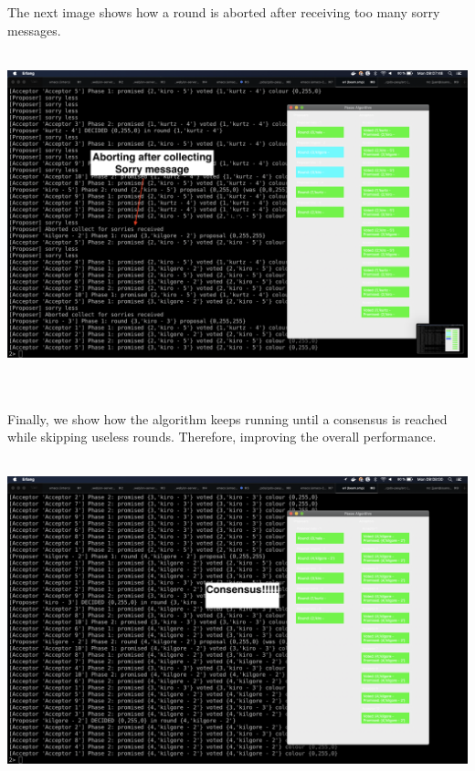 \documentclass[a4paper, 10pt]{article}
\begin{document}
The next image shows how a round is aborted after receiving too many sorry messages.\\\\
\begin{minipage}[t]{\linewidth}
  \centering
  \includegraphics[width=\textwidth]{aborted_sorry.png}
\end{minipage}\\\\

Finally, we show how the algorithm keeps running until a consensus is reached while skipping useless rounds. Therefore, improving the overall performance.\\\\
\begin{minipage}[t]{\linewidth}
  \centering
  \includegraphics[width=\textwidth]{consensus_sorry.png}
\end{minipage}\\
\end{document}
